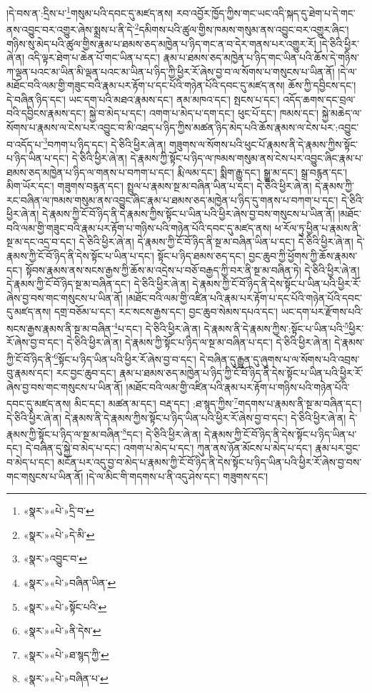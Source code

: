 །དེ་བས་ན་:དྲིས་པ་\footnote{«སྣར་»«པེ་»དྲི་བ་}གསུམ་པའི་དབང་དུ་མཛད་ནས། རབ་འབྱོར་ཁྱོད་ཀྱིས་གང་ཡང་འདི་སྐད་དུ་ཐེག་པ་དེ་གང་ནས་འབྱུང་བར་འགྱུར་ཞེས་སྨྲས་པ་ནི་དེ་\footnote{«སྣར་»«པེ་»དེ་མི་}དམིགས་པའི་ཚུལ་གྱིས་ཁམས་གསུམ་ནས་འབྱུང་བར་འགྱུར་ཞིང་། གཉིས་སུ་མེད་པའི་ཚུལ་གྱིས་རྣམ་པ་ཐམས་ཅད་མཁྱེན་པ་ཉིད་གང་ན་བ་དེར་གནས་པར་འགྱུར་རོ། །དེ་ཅིའི་ཕྱིར་ཞེ་ན། འདི་ལྟར་ཐེག་པ་ཆེན་པོ་གང་ཡིན་པ་དང་། རྣམ་པ་ཐམས་ཅད་མཁྱེན་པ་ཉིད་གང་ཡིན་པའི་ཆོས་དེ་གཉིས་ཀ་ལྡན་པའང་མ་ཡིན་མི་ལྡན་པའང་མ་ཡིན་པ་ཉིད་ཀྱི་ཕྱིར་རོ་ཞེས་བྱ་བ་ལ་སོགས་པ་གསུངས་པ་ཡིན་ནོ། །དེ་ལ་མཐོང་བའི་ལམ་གྱི་གཟུང་བའི་རྣམ་པར་རྟོག་པ་དང་པོའི་གཉེན་པོའི་དབང་དུ་མཛད་ནས། ཆོས་ཀྱི་དབྱིངས་དང་། དེ་བཞིན་ཉིད་དང་། ཡང་དག་པའི་མཐའ་རྣམས་དང་། ནམ་མཁའ་དང་། སྤངས་པ་དང་། འདོད་ཆགས་དང་བྲལ་བའི་དབྱིངས་རྣམས་དང་། སྐྱེ་བ་མེད་པ་དང་། འགག་པ་མེད་པ་དག་དང་། ཕུང་པོ་དང་། ཁམས་དང་། སྐྱེ་མཆེད་ལ་སོགས་པ་རྣམས་ལ་ངེས་པར་འབྱུང་བ་མི་འཐད་པ་ཉིད་ཀྱིས་མཚན་ཉིད་མེད་པའི་ཆོས་རྣམས་ལ་ངེས་པར་:འབྱུང་བ་འདོད་པ་\footnote{«སྣར་»འབྱུང་བ་}བཀག་པ་ཉིད་དང་། དེ་ཅིའི་ཕྱིར་ཞེ་ན། གཟུགས་ལ་སོགས་པའི་ཕུང་པོ་རྣམས་ནི་དེ་རྣམས་ཀྱིས་སྟོང་པ་ཉིད་ཡིན་པ་དང་། དེ་ཅིའི་ཕྱིར་ཞེ་ན། དེ་རྣམས་ཀྱི་སྟོང་པ་ཉིད་ལ་ཁམས་གསུམ་ནས་ངེས་པར་འབྱུང་ཞིང་རྣམ་པ་ཐམས་ཅད་མཁྱེན་པ་ཉིད་ལ་གནས་པ་བཀག་པ་དང་། རྨི་ལམ་དང་། སྨིག་རྒྱུ་དང་། སྒྱུ་མ་དང་། སྒྲ་བརྙན་དང་། མིག་ཡོར་དང་། གཟུགས་བརྙན་དང་། སྤྲུལ་པ་རྣམས་སྔ་མ་བཞིན་ཡིན་པ་དང་། དེ་ཅིའི་ཕྱིར་ཞེ་ན། དེ་རྣམས་ཀྱི་རང་བཞིན་ལ་ཁམས་གསུམ་ནས་འབྱུང་ཞིང་རྣམ་པ་ཐམས་ཅད་མཁྱེན་པ་ཉིད་དུ་གནས་པ་བཀག་པ་དང་། དེ་ཅིའི་ཕྱིར་ཞེ་ན། དེ་རྣམས་ཀྱི་ངོ་བོ་ཉིད་ནི་དེ་རྣམས་ཀྱིས་སྟོང་པ་ཡིན་པའི་ཕྱིར་ཞེས་བྱ་བས་གསུངས་པ་ཡིན་ནོ། །མཐོང་བའི་ལམ་གྱི་གཟུང་བའི་རྣམ་པར་རྟོག་པ་གཉིས་པའི་གཉེན་པོའི་དབང་དུ་མཛད་ནས། ཕ་རོལ་ཏུ་ཕྱིན་པ་རྣམས་ནི་སྔ་མ་དང་འདྲ་བ་དང་། དེ་ཅིའི་ཕྱིར་ཞེ་ན། དེ་རྣམས་ཀྱི་ངོ་བོ་ཉིད་ནི་སྔ་མ་བཞིན་ཡིན་པ་དང་། དེ་ཅིའི་ཕྱིར་ཞེ་ན། དེ་རྣམས་ཀྱི་ངོ་བོ་ཉིད་ནི་དེས་སྟོང་པ་ཡིན་པ་དང་། སྟོང་པ་ཉིད་ཐམས་ཅད་དང་། བྱང་ཆུབ་ཀྱི་ཕྱོགས་ཀྱི་ཆོས་རྣམས་དང་། སྟོབས་རྣམས་ནས་སངས་རྒྱས་ཀྱི་ཆོས་མ་འདྲེས་པ་བཅོ་བརྒྱད་ཀྱི་བར་ནི་སྔ་མ་བཞིན་ཏེ། དེ་ཅིའི་ཕྱིར་ཞེ་ན། དེ་རྣམས་ཀྱི་ངོ་བོ་ཉིད་སྔ་མ་བཞིན་དང་། དེ་ཅིའི་ཕྱིར་ཞེ་ན། དེ་རྣམས་ཀྱི་ངོ་བོ་ཉིད་ནི་དེས་སྟོང་པ་ཡིན་པའི་ཕྱིར་རོ་ཞེས་བྱ་བས་གང་གསུངས་པ་ཡིན་ནོ། །མཐོང་བའི་ལམ་གྱི་འཛིན་པའི་རྣམ་པར་རྟོག་པ་དང་པོའི་གཉེན་པོའི་དབང་དུ་མཛད་ནས། དགྲ་བཅོམ་པ་དང་། རང་སངས་རྒྱས་དང་། བྱང་ཆུབ་སེམས་དཔའ་དང་། ཡང་དག་པར་རྫོགས་པའི་སངས་རྒྱས་རྣམས་ནི་སྔ་མ་བཞིན་\footnote{«སྣར་»«པེ་»བཞིན་ཡིན་}པ་དང་། དེ་ཅིའི་ཕྱིར་ཞེ་ན། དེ་རྣམས་ནི་དེ་རྣམས་ཀྱིས་:སྟོང་པ་ཡིན་པའི་\footnote{«སྣར་»«པེ་»སྟོང་པའི་}ཕྱིར་རོ་ཞེས་བྱ་བ་དང་། དེ་ཅིའི་ཕྱིར་ཞེ་ན། དེ་རྣམས་ཀྱི་སྟོང་པ་ཉིད་ལ་སྔ་མ་བཞིན་པ་དང་། དེ་ཅིའི་ཕྱིར་ཞེ་ན། དེ་རྣམས་ཀྱི་ངོ་བོ་ཉིད་ནི་\footnote{«སྣར་»«པེ་»ནི་དེས་}སྟོང་པ་ཉིད་ཡིན་པའི་ཕྱིར་རོ་ཞེས་བྱ་བ་དང་། དེ་བཞིན་དུ་རྒྱུན་དུ་ཞུགས་པ་ལ་སོགས་པའི་འབྲས་བུ་རྣམས་དང་། རང་བྱང་ཆུབ་དང་། རྣམ་པ་ཐམས་ཅད་མཁྱེན་པ་ཉིད་ཀྱི་ངོ་བོ་ཉིད་ནི་དེས་སྟོང་པ་ཡིན་པའི་ཕྱིར་རོ་ཞེས་བྱ་བས་གང་གསུངས་པ་ཡིན་ནོ། །མཐོང་བའི་ལམ་གྱི་འཛིན་པའི་རྣམ་པར་རྟོག་པ་གཉིས་པའི་གཉེན་པོའི་དབང་དུ་མཛད་ནས། མིང་དང་། མཚན་མ་དང་། བརྡ་དང་། :ཐ་སྙད་ཀྱིས་\footnote{«སྣར་»«པེ་»ཐ་སྙད་ཀྱི་}གདགས་པ་རྣམས་ནི་སྔ་མ་བཞིན་དང་། དེ་ཅིའི་ཕྱིར་ཞེ་ན། དེ་རྣམས་ནི་དེ་རྣམས་ཀྱིས་སྟོང་པ་ཉིད་ཡིན་པའི་ཕྱིར་རོ་ཞེས་བྱ་བ་དང་། དེ་ཅིའི་ཕྱིར་ཞེ་ན། དེ་རྣམས་ཀྱི་སྟོང་པ་ཉིད་ལ་སྔ་མ་བཞིན་\footnote{«སྣར་»«པེ་»བཞིན་པ་}དང་། དེ་ཅིའི་ཕྱིར་ཞེ་ན། དེ་རྣམས་ཀྱི་ངོ་བོ་ཉིད་ནི་དེས་སྟོང་པ་ཉིད་ཡིན་པ་དང་། དེ་བཞིན་དུ་སྐྱེ་བ་མེད་པ་དང་། འགག་པ་མེད་པ་དང་། ཀུན་ནས་ཉོན་མོངས་པ་མེད་པ་དང་། རྣམ་པར་བྱང་བ་མེད་པ་དང་། མངོན་པར་འདུ་བྱ་བ་མེད་པ་རྣམས་ཀྱི་ངོ་བོ་ཉིད་ནི་དེས་སྟོང་པ་ཉིད་ཡིན་པའི་ཕྱིར་རོ་ཞེས་བྱ་བས་གང་གསུངས་པ་ཡིན་ནོ། །དེ་ལ་མིང་གི་གདགས་པ་ནི་འདུ་ཤེས་དང་། གཟུགས་དང་། 